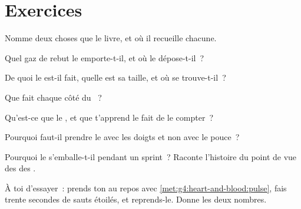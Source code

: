 \section{Exercices}

\begin{exercise}[$\star$]\label{exo:g4:heart-and-blood:1}
Nomme deux choses que le  livre, et où il recueille chacune.
\end{exercise}

\begin{exercise}[$\star$]\label{exo:g4:heart-and-blood:2}
Quel gaz de rebut le  emporte-t-il, et où le dépose-t-il~?
\end{exercise}

\begin{exercise}[$\star$]\label{exo:g4:heart-and-blood:3}
De quoi le  est-il fait, quelle est sa taille, et où se
trouve-t-il~?
\end{exercise}

\begin{exercise}[$\star$]\label{exo:g4:heart-and-blood:4}
Que fait chaque côté du ~?
\end{exercise}

\begin{exercise}[$\star$]\label{exo:g4:heart-and-blood:5}
Qu'est-ce que le , et que t'apprend le fait de le compter~?
\end{exercise}

\begin{exercise}[$\star$]\label{exo:g4:heart-and-blood:6}
Pourquoi faut-il prendre le  avec les doigts et non avec le
pouce~?
\end{exercise}

\begin{exercise}[$\star$]\label{exo:g4:heart-and-blood:7}
Pourquoi le  s'emballe-t-il pendant un sprint~? Raconte
l'histoire du point de vue des  des .
\end{exercise}

\begin{exercise}[$\star$]\label{exo:g4:heart-and-blood:8}
À toi d'essayer~: prends ton  au repos avec
\cref{met:g4:heart-and-blood:pulse}, fais trente secondes de sauts
étoilés, et reprends-le. Donne les deux nombres.
\end{exercise}

